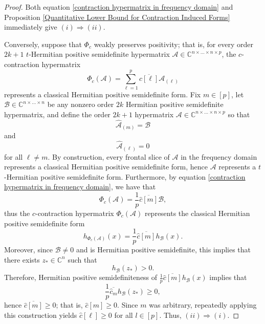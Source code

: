 \documentclass[10pt,a4paper]{amsart}
\begin{document}
\begin{proof}
    Both equation \eqref{contraction hypermatrix in frequency domain} and Proposition \ref{Quantitative Lower Bound for Contraction Induced Forms} immediately give $(i)\Rightarrow (ii)$. 

    Conversely, suppose that $\Phi_c$ weakly preserves positivity; that is, for every order $2k+1$ $t$-Hermitian positive semidefinite hypermatrix $\mathcal{A}\in \mathbb{C}^{n\times\dots\times n\times p}$, the $c$-contraction hypermatrix
    \[\Phi_c(\mathcal{A}) = \sum\limits_{\ell=1}^p\overline{c[\ell]}\mathcal{A}_{(\ell)}\]
    represents a classical Hermitian positive semidefinite form. Fix $m\in [p]$, let $\mathcal{B}\in\mathbb{C}^{n\times\dots\times n}$ be any nonzero order $2k$ Hermitian positive semidefinite hypermatrix, and define the order $2k+1$ hypermatrix $\mathcal{A}\in \mathbb{C}^{n\times\dots\times n\times p}$ so that 
    \[\widehat{\mathcal{A}}_{(m)} = \mathcal{B}\]
    and 
    \[\widehat{\mathcal{A}}_{(\ell)} = 0\]
    for all $\ell\neq m$. By construction, every frontal slice of $\mathcal{A}$ in the frequency domain represents a classical Hermitian positive semidefinite form, hence $\mathcal{A}$ represents a $t$-Hermitian positive semidefinite form. Furthermore, by equation \eqref{contraction hypermatrix in frequency domain}, we have that  
    \[\Phi_c(\mathcal{A}) = \frac{1}{p}\overline{\widehat{c}[m]}\mathcal{B},\]
    thus the $c$-contraction hypermatrix $\Phi_c(\mathcal{A})$ represents the classical Hermitian positive semidefinite form
    \[h_{\Phi_c(\mathcal{A})}(x) = \frac{1}{p}\overline{\widehat{c}[m]}h_{\mathcal{B}}(x).\]
    Moreover, since $\mathcal{B}\neq 0$ and is Hermitian positive semidefinite, this implies that there exists $z_*\in \mathbb{C}^n$ such that 
    \[h_{\mathcal{B}}(z_*)>0.\]
    Therefore, Hermitian positive semidefiniteness of $\frac{1}{p}\overline{\widehat{c}[m]}h_{\mathcal{B}}(x)$ implies that 
    \[\frac{1}{p}\overline{\widehat{c}_m}h_{\mathcal{B}}(z_*)\geq 0,\]
    hence $\overline{\widehat{c}[m]}\geq 0$; that is, $\widehat{c}[m]\geq 0$. Since $m$ was arbitrary, repeatedly applying this construction yields $\widehat{c}[\ell]\geq 0$ for all $l\in [p]$. Thus, $(ii)\Rightarrow (i)$. 


\end{proof}
\end{document}
